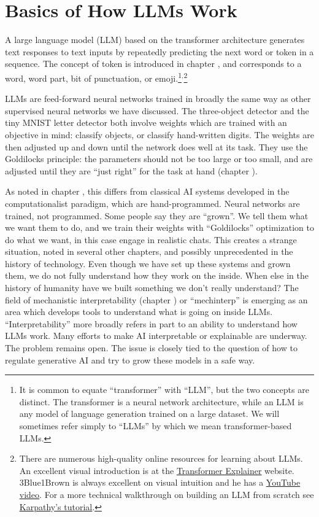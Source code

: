 \section{Basics of How LLMs Work}

A large language model (LLM) based on the
transformer architecture generates text responses to text inputs by
repeatedly predicting the next word or token in a sequence. The
concept of token is introduced in chapter , and corresponds to a word, word part, bit of punctuation, or emoji.\footnote{It is common to
equate ``transformer'' with ``LLM'', but the two concepts are distinct. The
transformer is a neural network architecture, while an LLM is any model
of language generation trained on a large dataset. We will
sometimes refer simply to ``LLMs'' by which we mean transformer-based
LLMs.}$^,$\footnote{There are numerous high-quality online resources for learning
about LLMs. An excellent visual introduction is at the
\href{https://poloclub.github.io/transformer-explainer/}{\underline{Transformer Explainer}} website. 3Blue1Brown is always
excellent on visual intuition and he has a
\href{https://www.youtube.com/watch?v=wjZofJX0v4M&list=PLZHQObOWTQDNU6R1_67000Dx_ZCJB-3pi}{\underline{YouTube
video}}. For a more technical walkthrough on building an LLM from scratch see
\href{https://www.youtube.com/watch?v=kCc8FmEb1nY}{\underline{Karpathy's
tutorial}}.}

LLMs are feed-forward neural networks trained in broadly the same way as other supervised neural networks we have discussed. The three-object detector and the tiny MNIST letter detector both involve weights which are trained with an objective in mind: classify objects, or classify hand-written digits. The weights are then adjusted up and down until the network does well at its task. They use the Goldilocks principle: the parameters should not be too large or too small, and are adjusted until they are ``just right'' for the task at hand (chapter ).

As noted in chapter , this differs from classical AI systems developed in the computationalist paradigm, which are hand-programmed. Neural networks are trained, not programmed. Some people say they are ``grown''. We tell them what we want them to do, and we train their weights with ``Goldilocks'' optimization to do what we want, in this case engage in realistic chats. This creates a strange situation, noted in several other chapters, and possibly unprecedented in the history of technology. Even though we have set up these systems and grown them, we do not fully understand how they work on the inside. When else in the history of humanity have we built something we don't really understand? The field of mechanistic interpretability (chapter ) or ``mechinterp'' is emerging as an area which develops tools to understand what is going on inside LLMs. ``Interpretability'' more broadly refers in part to an ability to understand how LLMs work. Many efforts to make AI interpretable or explainable are underway. The problem remains open. The issue is closely tied to the question of how to regulate generative AI and try to grow these models in a safe way.

